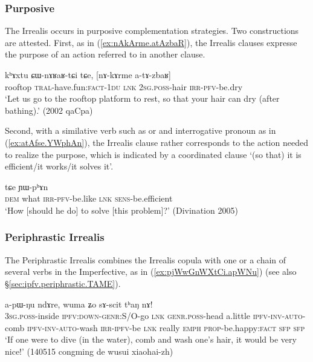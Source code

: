 \subsubsection{Purposive} \label{sec:irrealis.purposive}
The Irrealis occurs in purposive complementation strategies. Two constructions are attested. First, as in (\ref{ex:nAkArme.atAzbaR}), the Irrealis clauses expresse the purpose of an action referred to in another clause.

\begin{exe}
\ex \label{ex:nAkArme.atAzbaR}
\gll kʰɤxtu ɕɯ-nɤʁaʁ-tɕi tɕe, [nɤ-kɤrme a-tɤ-zbaʁ] \\
rooftop \textsc{tral}-have.fun:\textsc{fact}-\textsc{1du} \textsc{lnk} \textsc{2sg}.\textsc{poss}-hair \textsc{irr}-\textsc{pfv}-be.dry \\
\glt `Let us go to the rooftop platform to rest, so that your hair can dry (after bathing).' (2002 qaCpa)
\end{exe}

Second, with a similative verb such as  or  and interrogative pronoun as in (\ref{ex:atAfse.YWphAn}), the Irrealis clause rather corresponds to the action needed to realize the purpose, which is indicated by a coordinated clause  `(so that) it is efficient/it works/it solves it'. 

\begin{exe}
\ex \label{ex:atAfse.YWphAn}
 tɕe ɲɯ-pʰɤn \\
\textsc{dem} what \textsc{irr}-\textsc{pfv}-be.like \textsc{lnk} \textsc{sens}-be.efficient \\
\glt `How [should he do] to solve [this problem]?' (Divination 2005)
\end{exe}
 
\subsubsection{Periphrastic Irrealis} \label{sec:irrealis.periphrastic}
The Periphrastic Irrealis combines the Irrealis copula  with one or a chain of several verbs in the Imperfective, as in (\ref{ex:pjWwGnWXtCi.apWNu}) (see also §\ref{sec:ipfv.periphrastic.TAME}). 

\begin{exe}
\ex \label{ex:pjWwGnWXtCi.apWNu}
 a-pɯ-ŋu ndɤre, wuma ʑo sɤ-scit tʰaŋ nɤ! \\
\textsc{3sg}.\textsc{poss}-inside \textsc{ipfv}:\textsc{down}-\textsc{genr}:S/O-go \textsc{lnk} \textsc{genr}.\textsc{poss}-head a.little \textsc{ipfv}-\textsc{inv}-\textsc{auto}-comb \textsc{ipfv}-\textsc{inv}-\textsc{auto}-wash \textsc{irr}-\textsc{ipfv}-be \textsc{lnk} really \textsc{emph} \textsc{prop}-be.happy:\textsc{fact} \textsc{sfp} \textsc{sfp} \\
\glt `If one were to dive (in the water), comb and wash one's hair, it would be very nice!' (140515 congming de wusui xiaohai-zh)
\end{exe}


